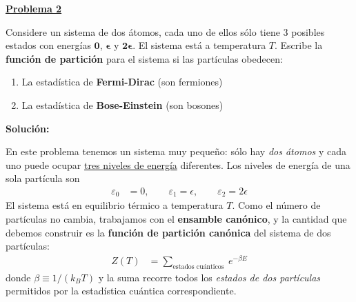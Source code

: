 \documentclass{article}
\newenvironment{AGbox}[1][7]%
{%
  \begin{tcolorbox}[
    enhanced, breakable,
    colframe=AppleGreen,
    colback=AppleGreen!#1,
    boxrule=1pt,
    borderline west={2mm}{-10mm}{AppleGreen},
    sharp corners=southwest,
    left=14pt,right=14pt,top=10pt,bottom=10pt,
     boxsep=6pt,
  ]%
}{%
  \end{tcolorbox}%
}
\begin{document}
\vspace{0.6cm}


\begin{AGbox}[8]
\textcolor{Apple Green}{\textbf{\underline{Problema 2}}} \vspace{2mm}

Considere un sistema de dos átomos, cada uno de ellos sólo tiene 3 posibles
estados con energías \textcolor{Tarawera}{$\boldsymbol{0}$}, \textcolor{vividviolet}{$\boldsymbol{\epsilon}$} y \textcolor{orange(colorwheel)}{$\boldsymbol{2\epsilon}$}. El sistema está a temperatura $T$. Escribe la
\textcolor{Cinnabar}{\textbf{función de partición}} para el sistema si las partículas obedecen:

\begin{enumerate}
    \item La estadística de \textcolor{Lochinvar}{\textbf{Fermi-Dirac}} (son fermiones)

    \item La estadística de \textcolor{orange(colorwheel)}{\textbf{Bose-Einstein}} (son bosones)
\end{enumerate}
\end{AGbox} \vspace{0.5cm}

\textcolor{Tuscany}{\textbf{Solución:}}

En este problema tenemos un sistema muy pequeño: sólo hay \emph{dos átomos} y cada uno
puede ocupar \underline{tres niveles de energía} diferentes. Los niveles
de energía de una sola partícula son
\begin{equation}
\begin{split}
\varepsilon_{0} &= 0, \qquad
\varepsilon_{1} = \epsilon, \qquad
\varepsilon_{2} = 2\epsilon
\end{split}\label{eq:niveles_una_particula}
\end{equation}
El sistema está en equilibrio térmico a temperatura \(T\). Como el número de partículas
no cambia, trabajamos con el \textcolor{Tarawera}{\textbf{ensamble canónico}}, y la cantidad que debemos
construir es la \textcolor{Cinnabar}{\textbf{función de partición canónica}} del sistema de dos partículas:
\begin{equation}
\begin{split}
Z(T)
&= \sum_{\text{estados cuánticos }} e^{-\beta E}
\end{split}\label{eq:def_Z_generica}
\end{equation}
donde
\(\beta \equiv 1/(k_{B}T)\) y la suma recorre todos los \emph{estados de dos partículas} permitidos
por la estadística cuántica correspondiente.
\end{document}
